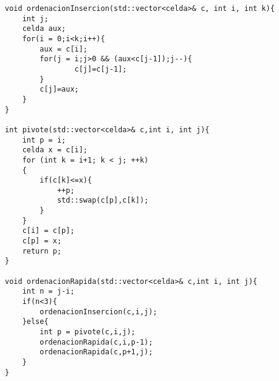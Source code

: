 \begin{lstlisting}
void ordenacionInsercion(std::vector<celda>& c, int i, int k){
    int j;
    celda aux;
    for(i = 0;i<k;i++){
        aux = c[i];
        for(j = i;j>0 && (aux<c[j-1]);j--){
                c[j]=c[j-1];
        }
        c[j]=aux;
    }
}	

int pivote(std::vector<celda>& c,int i, int j){
    int p = i;
    celda x = c[i];
    for (int k = i+1; k < j; ++k)
    {
        if(c[k]<=x){
            ++p;
            std::swap(c[p],c[k]);
        }
    }
    c[i] = c[p];
    c[p] = x;
    return p;
}

void ordenacionRapida(std::vector<celda>& c,int i, int j){
    int n = j-i;
    if(n<3){
        ordenacionInsercion(c,i,j);
    }else{
        int p = pivote(c,i,j);
        ordenacionRapida(c,i,p-1);
        ordenacionRapida(c,p+1,j);
    }
}
\end{lstlisting}